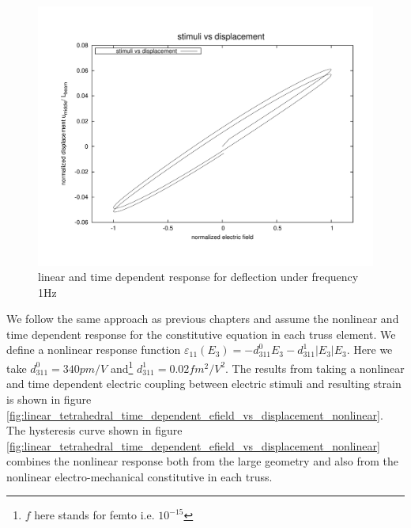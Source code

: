 \begin{figure}  
\centering
\includegraphics[width=5.0in]{./chap_5_active_trusses/images_non_linear_time_dependent_constitutive_equatio/linear_tetrahedral_time_dependent_efield_vs_displacement.pdf}
\caption{linear and time dependent response for deflection under frequency 1Hz}
\label{fig:linear_tetrahedral_time_dependent_efield_vs_displacement}
\end{figure} 

We follow the same approach as previous chapters and assume the nonlinear and time dependent response for the constitutive equation in each truss element.
We define a nonlinear response function $\varepsilon_{11}(E_3)=-d_{311}^0 E_3-d_{311}^1 |E_3| E_3$.
Here we take $d_{311}^0=340pm/V$ and\footnote{$f$ here stands for femto i.e. $10^{-15}$ } $d_{311}^1=0.02 fm^2/V^2 $.
The results from taking a nonlinear and time dependent electric coupling between electric stimuli and resulting strain is shown in figure \ref{fig:linear_tetrahedral_time_dependent_efield_vs_displacement_nonlinear}.
The hysteresis curve shown in figure \ref{fig:linear_tetrahedral_time_dependent_efield_vs_displacement_nonlinear} combines the nonlinear response both from the large geometry and also from the nonlinear electro-mechanical constitutive in each truss. 

